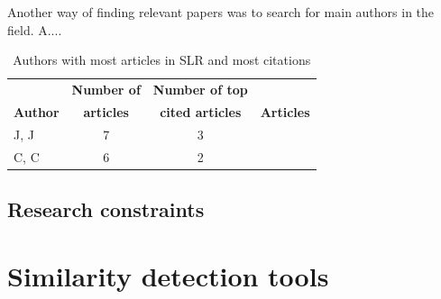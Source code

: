 \documentclass[a4paper, 12pt, oneside, openany, final, pdftex]{book}\usepackage[]{graphicx}\usepackage[]{color}
\begin{document}
Another way of finding relevant papers was to search for main authors in the field. A....

\begin{table} [bt]
	\centering
	\caption{Authors with most articles in SLR and most citations} \label{tbl:topAuthors}
	\begin{tabular}{l c c l} 
		\toprule
		& \textbf{Number of} & \textbf{Number of top} & \\
		\textbf{Author} & \textbf{articles} & \textbf{cited articles} & \textbf{Articles}\\ 
		\midrule 
		J, J         & 7 & 3 & \cite{ryan1991motivational} \\
		C, C   & 6 & 2 & \cite{ryan1991motivational}          \\
		\bottomrule
	\end{tabular}
\end{table}

\section{Research constraints}\label{sec:researchConstraints}

\chapter{Similarity detection tools}\label{ch:detectionTools}

    
\end{document}
